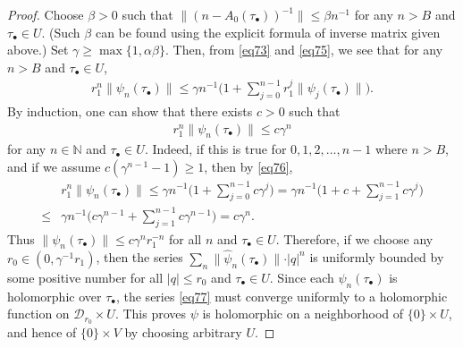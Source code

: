 \documentclass[11pt,b5paper,notitlepage]{article}
\theoremstyle{definition}
\theoremstyle{plain}
\newcommand{\mc}{\mathcal}
\newcommand{\wht}{\widehat}
\newcommand{\mbb}{\mathbb}
\newcommand{\blt}{\bullet}
\numberwithin{equation}{section}
\begin{document}
\begin{proof}
	
Choose $\beta>0$ such that  $\lVert (n- A_0(\tau_\blt))^{-1} \lVert\leq \beta n^{-1}$ for any $n> B$ and $\tau_\blt\in U$. (Such $\beta$ can be found using the explicit formula of inverse matrix given above.) Set $\gamma\geq\max\{1,\alpha\beta\}$. Then, from \eqref{eq73} and \eqref{eq75}, we see that for any $n>B$ and $\tau_\blt\in U$,
	\begin{align}
	r_1^n\lVert \psi_n(\tau_\blt) \lVert\leq \gamma n^{-1}\Big(1+\sum_{j=0}^{n-1}r_1^j\lVert \psi_j(\tau_\blt) \lVert\Big).\label{eq76}
	\end{align}
	By induction, one can show that there exists $c>0$ such that
	\begin{align*}
	r_1^n\lVert\psi_n(\tau_\blt)\lVert\leq c\gamma^n 
	\end{align*}
	for any $n\in\mbb N$ and $\tau_\blt\in U$. Indeed, if this is true for $0,1,2,\dots,n-1$ where $n>B$, and if we assume $c(\gamma^{n-1}-1)\geq 1$, then by \eqref{eq76},
	\begin{align*}
	&r_1^n\lVert \psi_n(\tau_\blt) \lVert\leq \gamma n^{-1}\Big(1+\sum_{j=0}^{n-1}c\gamma^j\Big)=\gamma n^{-1}\Big(1+c+\sum_{j=1}^{n-1}c\gamma^j\Big)\nonumber\\
	\leq &\gamma n^{-1}\Big(c\gamma^{n-1}+\sum_{j=1}^{n-1}c\gamma^{n-1}\Big)=c\gamma^n.
	\end{align*}
	Thus $\lVert\psi_n(\tau_\blt)\lVert\leq c\gamma^nr_1^{-n}$ for all $n$ and $\tau_\blt\in U$. Therefore, if we choose any $r_0\in(0,\gamma^{-1}r_1)$, then   the series $\sum_n\lVert \wht \psi_n(\tau_\blt) \lVert \cdot|q|^n$ is uniformly bounded by some positive number for all  $|q|\leq r_0$ and $\tau_\blt\in U$. Since each $\psi_n(\tau_\blt)$ is holomorphic over $\tau_\blt$, the series \eqref{eq77} must converge uniformly to a holomorphic function on $\mc D_{r_0}\times U$. This proves $\psi$ is holomorphic on a neighborhood of $\{0\}\times U$, and hence of $\{0\}\times V$ by choosing arbitrary $U$.
\end{proof}
\end{document}
